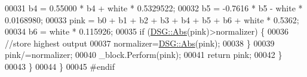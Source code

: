 \begin{DoxyCode}
00031             b4 = 0.55000 * b4 + white * 0.5329522;
00032             b5 = -0.7616 * b5 - white * 0.0168980;
00033             pink = b0 + b1 + b2 + b3 + b4 + b5 + b6 + white * 0.5362;
00034             b6 = white * 0.115926;
00035             \textcolor{keywordflow}{if} (\hyperlink{namespace_d_s_g_a0af03bade7e25e8da80e3022af0e45a7}{DSG::Abs}(pink)>normalizer) \{
00036                 \textcolor{comment}{//store highest output}
00037                 normalizer=\hyperlink{namespace_d_s_g_a0af03bade7e25e8da80e3022af0e45a7}{DSG::Abs}(pink);
00038             \}
00039             pink/=normalizer;
00040             \_block.Perform(pink);
00041             \textcolor{keywordflow}{return} pink;
00042         \}
00043     \}
00044 \}
00045 \textcolor{preprocessor}{#endif}
\end{DoxyCode}
